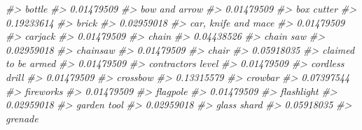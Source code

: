 \documentclass[
]{krantz}
\makeatletter
\newenvironment{Shaded}{\begin{snugshade}}{\end{snugshade}}
\newcommand{\CommentTok}[1]{\textcolor[rgb]{0.37,0.37,0.37}{\textit{#1}}}
\newenvironment{kframe}{%
\medskip{}
\setlength{\fboxsep}{.8em}
 \def\at@end@of@kframe{}%
 \ifinner\ifhmode%
  \def\at@end@of@kframe{\end{minipage}}%
  \begin{minipage}{\columnwidth}%
 \fi\fi%
 \def\FrameCommand##1{\hskip\@totalleftmargin \hskip-\fboxsep
 \colorbox{shadecolor}{##1}\hskip-\fboxsep
     \hskip-\linewidth \hskip-\@totalleftmargin \hskip\columnwidth}%
 \MakeFramed {\advance\hsize-\width
   \@totalleftmargin\z@ \linewidth\hsize
   \@setminipage}}%
 {\par\unskip\endMakeFramed%
 \at@end@of@kframe}
\renewenvironment{Shaded}{\begin{kframe}}{\end{kframe}}
\makeatother
\begin{document}
\begin{Shaded}
\begin{Highlighting}[]
\CommentTok{\#\textgreater{}                           bottle }
\CommentTok{\#\textgreater{}                       0.01479509 }
\CommentTok{\#\textgreater{}                    bow and arrow }
\CommentTok{\#\textgreater{}                       0.01479509 }
\CommentTok{\#\textgreater{}                       box cutter }
\CommentTok{\#\textgreater{}                       0.19233614 }
\CommentTok{\#\textgreater{}                            brick }
\CommentTok{\#\textgreater{}                       0.02959018 }
\CommentTok{\#\textgreater{}              car, knife and mace }
\CommentTok{\#\textgreater{}                       0.01479509 }
\CommentTok{\#\textgreater{}                          carjack }
\CommentTok{\#\textgreater{}                       0.01479509 }
\CommentTok{\#\textgreater{}                            chain }
\CommentTok{\#\textgreater{}                       0.04438526 }
\CommentTok{\#\textgreater{}                        chain saw }
\CommentTok{\#\textgreater{}                       0.02959018 }
\CommentTok{\#\textgreater{}                         chainsaw }
\CommentTok{\#\textgreater{}                       0.01479509 }
\CommentTok{\#\textgreater{}                            chair }
\CommentTok{\#\textgreater{}                       0.05918035 }
\CommentTok{\#\textgreater{}              claimed to be armed }
\CommentTok{\#\textgreater{}                       0.01479509 }
\CommentTok{\#\textgreater{}               contractor\textquotesingle{}s level }
\CommentTok{\#\textgreater{}                       0.01479509 }
\CommentTok{\#\textgreater{}                   cordless drill }
\CommentTok{\#\textgreater{}                       0.01479509 }
\CommentTok{\#\textgreater{}                         crossbow }
\CommentTok{\#\textgreater{}                       0.13315579 }
\CommentTok{\#\textgreater{}                          crowbar }
\CommentTok{\#\textgreater{}                       0.07397544 }
\CommentTok{\#\textgreater{}                        fireworks }
\CommentTok{\#\textgreater{}                       0.01479509 }
\CommentTok{\#\textgreater{}                         flagpole }
\CommentTok{\#\textgreater{}                       0.01479509 }
\CommentTok{\#\textgreater{}                       flashlight }
\CommentTok{\#\textgreater{}                       0.02959018 }
\CommentTok{\#\textgreater{}                      garden tool }
\CommentTok{\#\textgreater{}                       0.02959018 }
\CommentTok{\#\textgreater{}                      glass shard }
\CommentTok{\#\textgreater{}                       0.05918035 }
\CommentTok{\#\textgreater{}                          grenade }

\end{Highlighting}
\end{Shaded}
\end{document}
